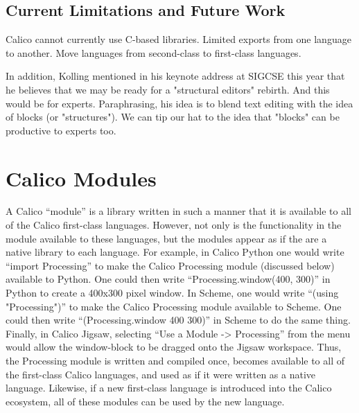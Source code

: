 \documentclass[preprint]{sigplanconf}
\begin{document}
\subsection{Current Limitations and Future Work}

Calico cannot currently use C-based libraries.
Limited exports from one language to another.
Move languages from second-class to first-class languages.

In addition, Kolling mentioned in his keynote address at SIGCSE this
year that he believes that we may be ready for a "structural editors"
rebirth. And this would be for experts. Paraphrasing, his idea is to
blend text editing with the idea of blocks (or "structures"). We can
tip our hat to the idea that "blocks" can be productive to experts
too.

\section{Calico Modules}

A Calico ``module'' is a library written in such a manner that it is
available to all of the Calico first-class languages. However, not
only is the functionality in the module available to these languages,
but the modules appear as if the are a native library to each
language. For example, in Calico Python one would write ``import
Processing'' to make the Calico Processing module (discussed below)
available to Python. One could then write ``Processing.window(400,
300)'' in Python to create a 400x300 pixel window. In Scheme, one
would write ``(using "Processing")'' to make the Calico Processing
module available to Scheme. One could then write ``(Processing.window
400 300)'' in Scheme to do the same thing. Finally, in Calico Jigsaw,
selecting ``Use a Module -> Processing'' from the menu would allow the
window-block to be dragged onto the Jigsaw workspace. Thus, the
Processing module is written and compiled once, becomes available to
all of the first-class Calico languages, and used as if it were
written as a native language. Likewise, if a new first-class language
is introduced into the Calico ecosystem, all of these modules can be
used by the new language.
\end{document}

